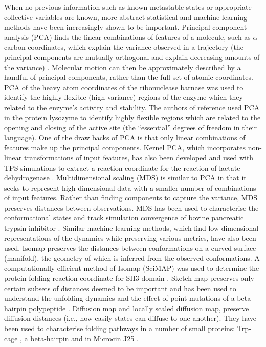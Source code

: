 When no previous information such as known metastable states or appropriate collective variables are known, more abstract statistical and machine learning methods have been increasingly shown to be important. Principal component analysis (PCA) finds the linear combinations of features of a molecule, such as $\alpha$-carbon coordinates, which explain the variance observed in a trajectory (the principal components are mutually orthogonal and explain decreasing amounts of the variance)\cite{pearson1901liii}  . Molecular motion can then be approximately described by a handful of principal components, rather than the full set of atomic coordinates. PCA of the heavy atom coordinates of the ribonuclease barnase \cite{noldeEssentialDomainMotions2002} was used to identify the highly flexible (high variance) regions of the enzyme which they related to the enzyme's  activity and stability. The authors of reference \cite{amadeiEssentialDynamicsProteins1993a} used PCA in the  protein lysozyme to identify highly flexible  regions which are related to the opening and closing of the active site (the ``essential'' degrees of freedom in their language).  One of the draw backs of PCA is that only linear combinations of features make up the principal components.  Kernel PCA, which incorporates non-linear transformations of input features, has also been developed and used with TPS simulations to extract a reaction coordinate for the reaction of lactate  dehydrogenase \cite{antoniouIdentificationReactionCoordinate2011,quaytmanReactionCoordinateEnzymatic2007}. Multidimensional scaling (MDS) \cite{borg1997modern} is similar to PCA in that it seeks to represent high dimensional data with a smaller number of  combinations of input features. Rather than finding components to capture the variance, MDS preserves distances between observations.  MDS has been used to characterise the conformational states and track simulation convergence of bovine pancreatic trypsin inhibitor \cite{troyerProteinConformationalLandscapes1995}. Similar machine learning methods, which find low dimensional representations of the dynamics while preserving various metrics, have also been used.  Isomap \cite{tenenbaumGlobalGeometricFramework2000} preserves the distances between conformations on a curved surface (manifold), the geometry of which is inferred from the observed conformations. A computationally efficient method of Isomap (SciMAP)  was used to determine the protein folding reaction coordinate for SH3 domain \cite{dasLowdimensionalFreeenergyLandscapes2006}. Sketch-map \cite{ceriottiSimplifyingRepresentationComplex2011} preserves only certain subsets of distances deemed to be important and has been used to understand the unfolding dynamics and the effect of point mutations of a beta hairpin polypeptide \cite{ardevolProbingUnfoldedConfigurations2015}. 
Diffusion map \cite{fergusonNonlinearDimensionalityReduction2011} and locally scaled diffusion map, preserve diffusion distances (i.e., how easily states can diffuse to one another). They have been used to characterise folding pathways in a number of small proteins:  Trp-cage \cite{kimSystematicCharacterizationProtein2015}, a beta-hairpin \cite{zhengDelineationFoldingPathways2011} and in Microcin J25 \cite{fergusonNonlinearDimensionalityReduction2011}. 

